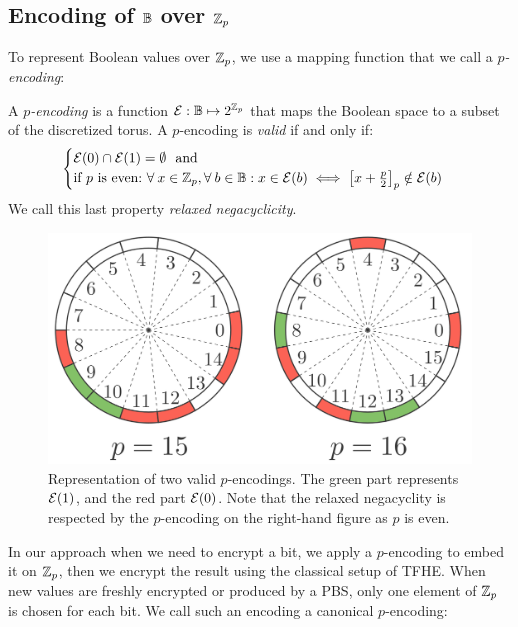 \subsection{Encoding of $\mathbb{B}$ over $\mathbb{Z}_p$}

To represent Boolean values over $\mathbb{Z}_p$, we use a mapping function that we call a \emph{$p$-encoding}:

\begin{definition}[$p$-encoding]
    A \emph{$p$-encoding} is a function $\mathcal{E}: \mathbb{B} \mapsto 2^{\mathbb{Z}_p}$ that maps the Boolean space to a subset of the discretized torus. A $p$-encoding is \emph{valid} if and only if:
    \begin{equation}
        \begin{cases}
            \mathcal{E}(0) \cap \mathcal{E}(1) = \emptyset~\text{ and}\\
            \text{if $p$ is even:} ~\forall \:x \in \mathbb Z_p, \forall \:b \in \mathbb{B}: x \in \mathcal{E}(b) \iff \left [ x + \frac p 2 \right ]_p \notin \mathcal{E}(b)
        \end{cases}
    \label{def:validity}
    \end{equation}
    We call this last property \emph{relaxed negacyclicity}.
    \label{def:encoding}
\end{definition}


\begin{figure}
  \centering
    \includegraphics[scale=0.2]{img/to_harmonize/encoding_example_double.png}
  \caption{Representation of two valid $p$-encodings. The green part represents $\mathcal{E}(1)$,  and the red part $\mathcal{E}(0)$. Note that the relaxed negacyclity is respected by the $p$-encoding on the right-hand figure as $p$ is even.}
  \label{fig:encodings}
\end{figure}


In our approach when we need to encrypt a bit, we apply a $p$-encoding to embed it on $\mathbb{Z}_p$, then we encrypt the result using the classical setup of TFHE.  When new values are freshly encrypted or produced by a PBS, only one element of $ \mathbb{Z}_p$ is chosen for each bit. We call such an encoding a canonical $p$-encoding:

